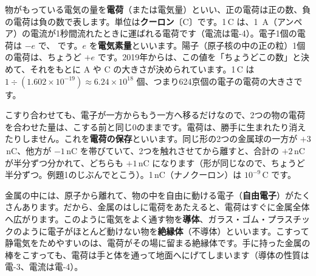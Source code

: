物がもっている電気の量を\textbf{電荷}（または電気量）といい、正の電荷は正の数、負の電荷は負の数で表します。単位は\textbf{クーロン}〔C〕です。1\,C は、\qty{1}{A}（アンペア）の電流が1秒間流れたときに運ばれる電荷です（電流は電-4）。電子1個の電荷は $-e$ で、
です。$e$ を\textbf{電気素量}といいます。陽子（原子核の中の正の粒）1個の電荷は、ちょうど $+e$ です。2019年からは、この値を「ちょうどこの数」と決めて、それをもとに A や C の大きさが決められています。1\,C は $1\div(1.602\times10^{-19})\approx6.24\times10^{18}$ 個、つまり624京個の電子の電荷の大きさです。

こすり合わせても、電子が一方からもう一方へ移るだけなので、2つの物の電荷を合わせた量は、こする前と同じ0のままです。電荷は、勝手に生まれたり消えたりしません。これを\textbf{電荷の保存}といいます。同じ形の2つの金属球の一方が $+3$\,nC、他方が $-1$\,nC を帯びていて、2つを触れさせてから離すと、合計の $+2$\,nC が半分ずつ分かれて、どちらも $+1$\,nC になります（形が同じなので、ちょうど半分ずつ。例題1のじぶんでとこう）。1\,nC（ナノクーロン）は $10^{-9}$\,C です。

金属の中には、原子から離れて、物の中を自由に動ける電子（\textbf{自由電子}）がたくさんあります。だから、金属のはしに電荷をあたえると、電荷はすぐに金属全体へ広がります。このように電気をよく通す物を\textbf{導体}、ガラス・ゴム・プラスチックのように電子がほとんど動けない物を\textbf{絶縁体}（不導体）といいます。こすって静電気をためやすいのは、電荷がその場に留まる絶縁体です。手に持った金属の棒をこすっても、電荷は手と体を通って地面へにげてしまいます（導体の性質は電-3、電流は電-4）。

\begin{bkfigure}
\label{ph:電-1:fig-retsu}
\end{bkfigure}

